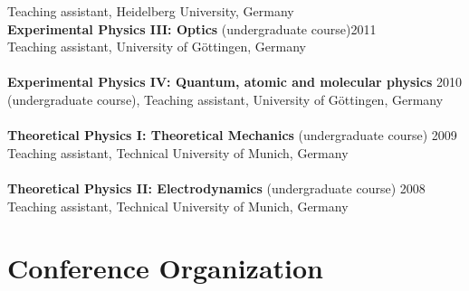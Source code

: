\documentclass[margin,line]{res}
\begin{document}
\begin{resume}
Teaching assistant, Heidelberg University, Germany\\
{\bf Experimental Physics III: Optics}  (undergraduate course)\hfill {2011}\\
Teaching assistant, University of Göttingen, Germany \\
\vspace*{-3mm}\\
{\bf Experimental Physics IV: Quantum, atomic and molecular physics}  \hfill {2010}\\
(undergraduate course), Teaching assistant, University of Göttingen, Germany\\
\vspace*{-3mm}\\
{\bf Theoretical Physics I: Theoretical Mechanics} (undergraduate course) \hfill {2009}\\
Teaching assistant, Technical University of Munich, Germany\\
\vspace*{-3mm}\\
{\bf Theoretical Physics II: Electrodynamics} (undergraduate course) \hfill {2008}\\
Teaching assistant, Technical University of Munich, Germany\\


\section{\sc Conference Organization}


\end{resume}
\end{document}
